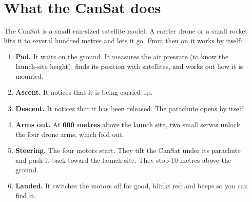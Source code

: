 \documentclass[11pt,a4paper,oneside]{article}
\begin{document}
\tableofcontents
\newpage

\section{What the CanSat does}\label{sec:about}

The CanSat is a small can-sized satellite model. A carrier drone or a small rocket lifts it
to several hundred metres and lets it go. From then on it works by itself:

\begin{figure}[H]\centering
{}
\end{figure}

\begin{enumerate}
  \item \textbf{Pad.} It waits on the ground. It measures the air pressure (to know the
        launch-site height), finds its position with satellites, and works out how it is mounted.
  \item \textbf{Ascent.} It notices that it is being carried up.
  \item \textbf{Descent.} It notices that it has been released. The parachute opens by itself.
  \item \textbf{Arms out.} At \textbf{600 metres} above the launch site, two small servos unlock
        the four drone arms, which fold out.
  \item \textbf{Steering.} The four motors start. They tilt the CanSat under its parachute and push it
        back toward the launch site. They stop 10 metres above the ground.
  \item \textbf{Landed.} It switches the motors off for good, blinks red and beeps so you can find it.
\end{enumerate}
\end{document}
